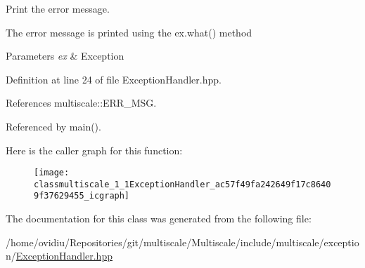 \-Print the error message. 

\-The error message is printed using the ex.\-what() method


\begin{DoxyParams}{\-Parameters}
{\em ex} & \-Exception \\
\hline
\end{DoxyParams}


\-Definition at line 24 of file \-Exception\-Handler.\-hpp.



\-References multiscale\-::\-E\-R\-R\-\_\-\-M\-S\-G.



\-Referenced by main().



\-Here is the caller graph for this function\-:\nopagebreak
\begin{figure}[H]
\begin{center}
\leavevmode
\texttt{[image: classmultiscale\_1\_1ExceptionHandler\_ac57f49fa242649f17c86409f37629455\_icgraph]}
\end{center}
\end{figure}




\-The documentation for this class was generated from the following file\-:\begin{DoxyCompactItemize}
\item 
/home/ovidiu/\-Repositories/git/multiscale/\-Multiscale/include/multiscale/exception/\hyperlink{ExceptionHandler_8hpp}{\-Exception\-Handler.\-hpp}\end{DoxyCompactItemize}
